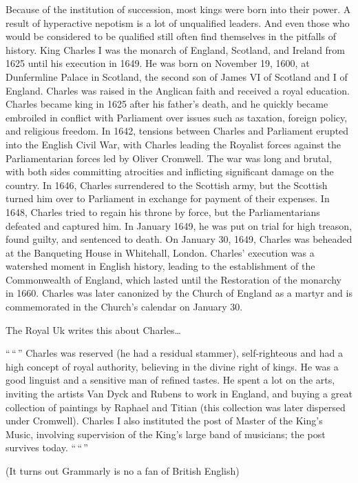 \documentclass[
]{article}
\begin{document}
Because of the institution of succession, most kings were born into
their power. A result of hyperactive nepotism is a lot of unqualified
leaders. And even those who would be considered to be qualified still
often find themselves in the pitfalls of history. King Charles I was the
monarch of England, Scotland, and Ireland from 1625 until his execution
in 1649. He was born on November 19, 1600, at Dunfermline Palace in
Scotland, the second son of James VI of Scotland and I of England.
Charles was raised in the Anglican faith and received a royal education.
Charles became king in 1625 after his father's death, and he quickly
became embroiled in conflict with Parliament over issues such as
taxation, foreign policy, and religious freedom. In 1642, tensions
between Charles and Parliament erupted into the English Civil War, with
Charles leading the Royalist forces against the Parliamentarian forces
led by Oliver Cromwell. The war was long and brutal, with both sides
committing atrocities and inflicting significant damage on the country.
In 1646, Charles surrendered to the Scottish army, but the Scottish
turned him over to Parliament in exchange for payment of their expenses.
In 1648, Charles tried to regain his throne by force, but the
Parliamentarians defeated and captured him. In January 1649, he was put
on trial for high treason, found guilty, and sentenced to death. On
January 30, 1649, Charles was beheaded at the Banqueting House in
Whitehall, London. Charles' execution was a watershed moment in English
history, leading to the establishment of the Commonwealth of England,
which lasted until the Restoration of the monarchy in 1660. Charles was
later canonized by the Church of England as a martyr and is commemorated
in the Church's calendar on January 30.

The Royal Uk writes this about Charles\ldots{}

``\,``\,'' Charles was reserved (he had a residual stammer),
self-righteous and had a high concept of royal authority, believing in
the divine right of kings. He was a good linguist and a sensitive man of
refined tastes. He spent a lot on the arts, inviting the artists Van
Dyck and Rubens to work in England, and buying a great collection of
paintings by Raphael and Titian (this collection was later dispersed
under Cromwell). Charles I also instituted the post of Master of the
King's Music, involving supervision of the King's large band of
musicians; the post survives today. ``\,``\,''

(It turns out Grammarly is no a fan of British English)
\end{document}
